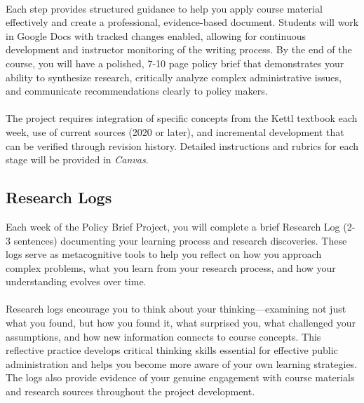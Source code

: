 \documentclass[11pt, letterpaper]{article}
\begin{document}
\paragraph{}Each step provides structured guidance to help you apply course material effectively and create a professional, evidence-based document. Students will work in Google Docs with tracked changes enabled, allowing for continuous development and instructor monitoring of the writing process. By the end of the course, you will have a polished, 7-10 page policy brief that demonstrates your ability to synthesize research, critically analyze complex administrative issues, and communicate recommendations clearly to policy makers.
\vspace{1ex}
\paragraph{}The project requires integration of specific concepts from the Kettl textbook each week, use of current sources (2020 or later), and incremental development that can be verified through revision history. Detailed instructions and rubrics for each stage will be provided in \emph{Canvas}.

\subsection*{Research Logs}

Each week of the Policy Brief Project, you will complete a brief Research Log (2-3 sentences) documenting your learning process and research discoveries. These logs serve as metacognitive tools to help you reflect on how you approach complex problems, what you learn from your research process, and how your understanding evolves over time.
\vspace{1ex}
\paragraph{}Research logs encourage you to think about your thinking---examining not just what you found, but how you found it, what surprised you, what challenged your assumptions, and how new information connects to course concepts. This reflective practice develops critical thinking skills essential for effective public administration and helps you become more aware of your own learning strategies. The logs also provide evidence of your genuine engagement with course materials and research sources throughout the project development.
\end{document}
